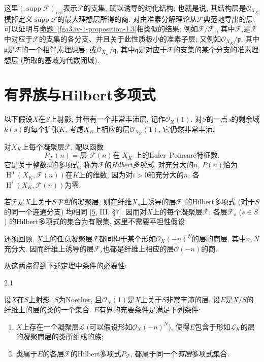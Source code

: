 \par{}这里\((\operatorname {supp}\mathscr {F})_\mathrm {red}\)表示\(\mathscr {F}\)的支集, 赋以诱导的约化结构; 也就是说, 其结构层是\(\mathcal {O}_{X_K}\)模掉定义\(\operatorname {supp}\mathscr {F}\)的最大理想层所得的商. 对由准素分解理论从\(\mathscr {F}\)典范地导出的层, 可以证明与\hyperref[fga3.iv-1-proposition-1.3]{命题~\ref*{fga3.iv-1-proposition-1.3}}相类似的结果; 例如\(\mathscr {F}/\mathscr {F}_i\), 其中\(\mathscr {F}_i\)是\(\mathscr {F}\)中对应于\(\mathscr {F}\)的支集的各分支、并且关于此性质极小的准素子层; 又例如\(\mathcal {O}_{X_K}/\mathfrak {p}\), 其中\(\mathfrak {p}\)是\(\mathscr {F}\)的一个相伴素理想层; 或\(\mathcal {O}_{X_K}/\mathfrak {q}\), 其中\(\mathfrak {q}\)是对应于\(\mathscr {F}\)的支集的某个分支的准素理想层 (所取的基域为代数闭域).
\chapter{有界族与Hilbert多项式}\thispagestyle{fancy}\label{fga3.iv-2}
\par{}以下假设\(X\)在\(S\)上射影, 并带有一个非常丰沛层, 记作\(\mathcal {O}_X(1)\). 对\(S\)的一点\(s\)的剩余域\(k(s)\)的每个扩张\(K\), 考虑\(X_K\)上相应的层\(\mathcal {O}_{X_K}(1)\), 它仍然非常丰沛.
\par{}对\(X_K\)上每个凝聚层\(\mathscr {F}\), 配以函数\[     P_\mathscr {F}(n)     = \text {层 }\mathscr {F}(n)\text {在 }X_K\text { 上的Euler–Poincaré特征数}.\] 它是关于整数\(n\)的多项式, 称为\(\mathscr {F}\)的\emph{Hilbert多项式}. 对充分大的\(n\), \(P(n)\)恰为\(\operatorname {H}^0(X_K,\mathscr {F}(n))\)在\(K\)上的维数, 因为对\(i>0\)和充分大的\(n\), 各\(\operatorname {H}^i(X_K,\mathscr {F}(n))\)为零.
\par{}若\(\mathscr {F}\)是\(X\)上关于\(S\)\emph{平坦}的凝聚层, 则在纤维\(X_s\)上诱导的层\(\mathscr {F}_s\)的Hilbert多项式 (对于\(S\)的同一个连通分支) 均相同 [\hyperref[GD1960]{5}, III, §7]. 因而对\(X\)上的每个凝聚层\(\mathscr {F}\), 各层\(\mathscr {F}_s\) (\(s\in  S\)) 的Hilbert多项式的集合为有限集, 这里不需要平坦性假设.
\par{}还须回顾, \(X\)上的任意凝聚层\(\mathscr {F}\)都同构于某个形如\(\mathcal {O}_X(-n)^N\)的层的商层, 其中\(n,N\)充分大. 因而纤维上诱导的层\(\mathscr {F}_s\)也都是纤维上相应的层\(\mathcal {O}(-n)\)的商.
\par{}从这两点得到下述定理中条件的必要性:
\begin{theorem}{2.1}\label{fga3.iv-2-theorem-2.1}\skipsinglepar
\par{}设\(X\)在\(S\)上射影, \(S\)为Noether, 且\(\mathcal {O}_X(1)\)是\(X\)上关于\(S\)非常丰沛的层. 设\(E\)是\(X/S\)的纤维上的层的类的一个集合. \(E\)有界的充要条件是满足下列条件: 
\begin{enumerate}
      
 \item[a.]\(X\)上存在一个凝聚层\(\mathscr {L}\) (可以假设形如\(\mathcal {O}_X(-n)^N\)), 使得\(E\)包含于形如\(\mathscr {L}_K\)的层的凝聚商层的类所组成的族;

      
 \item[b.]类属于\(E\)的各层\(\mathscr {F}\)的Hilbert多项式\(P_\mathscr {F}\), 都属于同一个\emph{有限}多项式集合.

    
\end{enumerate}
\end{theorem}
